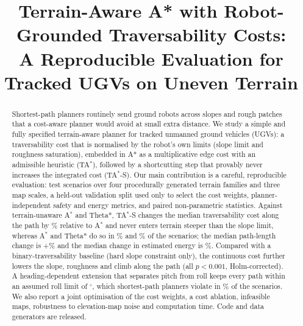 \documentclass[conference]{IEEEtran}
\newcommand{\TAS}{TA$^*$-S}
\newcommand{\TA}{TA$^*$}
\newcommand{\Astar}{A$^*$}
\begin{document}
\title{Terrain-Aware A* with Robot-Grounded Traversability Costs:\\
A Reproducible Evaluation for Tracked UGVs on Uneven Terrain}

\author{
}

\maketitle

\begin{abstract}
Shortest-path planners routinely send ground robots across slopes and rough
patches that a cost-aware planner would avoid at small extra distance. We
study a simple and fully specified terrain-aware planner for tracked unmanned
ground vehicles (UGVs): a traversability cost that is normalised by the
robot's own limits (slope limit and roughness saturation), embedded in A* as a
multiplicative edge cost with an admissible heuristic (\TA), followed by a
shortcutting step that provably never increases the integrated cost (\TAS).
Our main contribution is a careful, reproducible evaluation: \nTest{} test
scenarios over four procedurally generated terrain families and three map
scales, a held-out validation split used only to select the cost weights,
planner-independent safety and energy metrics, and paired non-parametric
statistics. Against terrain-unaware \Astar{} and Theta*, \TAS{} changes the median traversability cost along the path by
\costRelTAS\% relative to \Astar{} and never enters terrain steeper than the
slope limit, whereas \Astar{} and Theta* do so in \exposedA\% and
\exposedTheta\% of the scenarios; the median path-length change is
+\lenRelTAS\% and the median change in estimated energy is \energyRelTAS\%.
Compared with a binary-traversability baseline (hard slope constraint only),
the continuous cost further lowers the slope, roughness and climb along the
path (all $p<0.001$, Holm-corrected). A heading-dependent extension that
separates pitch from roll keeps every path within an assumed roll limit of
\rlMain$^\circ$, which shortest-path planners violate in \rlAExposedMain\% of the
scenarios. We also report a joint optimisation of the cost weights, a cost
ablation, infeasible maps, robustness to elevation-map noise and computation
time. Code and data generators are released.
\end{abstract}
\end{document}
